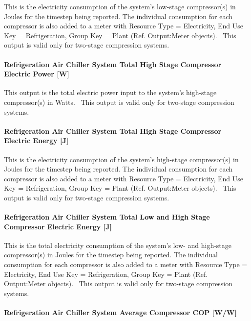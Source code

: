 This is the electricity consumption of the system's low-stage compressor(s) in Joules for the timestep being reported. The individual consumption for each compressor is also added to a meter with Resource Type = Electricity, End Use Key = Refrigeration, Group Key = Plant (Ref. Output:Meter objects).~ This output is valid only for two-stage compression systems.

\paragraph{Refrigeration Air Chiller System Total High Stage Compressor Electric Power {[}W{]}}\label{refrigeration-air-chiller-system-total-high-stage-compressor-electric-power-w}

This output is the total electric power input to the system's high-stage compressor(s) in Watts.~ This output is valid only for two-stage compression systems.

\paragraph{Refrigeration Air Chiller System Total High Stage Compressor Electric Energy {[}J{]}}\label{refrigeration-air-chiller-system-total-high-stage-compressor-electric-energy-j}

This is the electricity consumption of the system's high-stage compressor(s) in Joules for the timestep being reported. The individual consumption for each compressor is also added to a meter with Resource Type = Electricity, End Use Key = Refrigeration, Group Key = Plant (Ref. Output:Meter objects).~ This output is valid only for two-stage compression systems.

\paragraph{Refrigeration Air Chiller System Total Low and High Stage Compressor Electric Energy {[}J{]}}\label{refrigeration-air-chiller-system-total-low-and-high-stage-compressor-electric-energy-j}

This is the total electricity consumption of the system's low- and high-stage compressor(s) in Joules for the timestep being reported. The individual consumption for each compressor is also added to a meter with Resource Type = Electricity, End Use Key = Refrigeration, Group Key = Plant (Ref. Output:Meter objects).~ This output is valid only for two-stage compression systems.

\paragraph{Refrigeration Air Chiller System Average Compressor COP {[}W/W{]}}\label{refrigeration-air-chiller-system-average-compressor-cop-ww}

